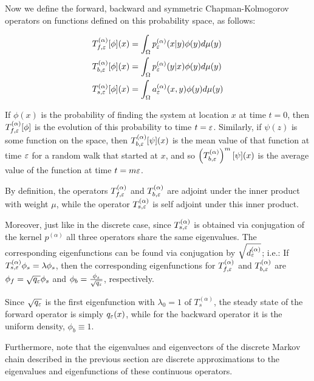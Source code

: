 Now we define the  forward, backward and symmetric Chapman-Kolmogorov operators on functions defined on this probability space, as follows:

\begin{definition}\begin{equation*}\begin{aligned}
T_{f,\varepsilon}^{(\alpha)}[\phi](x) &= \int_\Omega p_\varepsilon^{(\alpha)}(x|y)\phi(y)d\mu(y)\\
T_{b,\varepsilon}^{(\alpha)}[\phi](x) &= \int_\Omega p_\varepsilon^{(\alpha)}(y|x)\phi(y)d\mu(y)\\
T_{s,\varepsilon}^{(\alpha)}[\phi](x) &= \int_\Omega a_\varepsilon^{(\alpha)}(x,y)\phi(y)d\mu(y)
\end{aligned}\end{equation*}\end{definition}

If $\phi(x)$ is the probability of finding the system at location $x$ at time $t = 0$, then $T_{f,\varepsilon}^{(\alpha)}[\phi]$ is the evolution of this probability to time $t = \varepsilon$. Similarly, if $\psi(z)$ is some function on the space, then $T_{b,\varepsilon}^{(\alpha)}[\psi](x)$ is the mean value of that function at time $\varepsilon$ for a random walk that started at $x$, and so $\left(T_{b,\varepsilon}^{(\alpha)}\right)^m[\psi](x)$ is the average value of the function at time $t = m\varepsilon$.

By definition, the operators $T_{f,\varepsilon}^{(\alpha)}$ and $T_{b,\varepsilon}^{(\alpha)}$ are adjoint under the inner product with weight $\mu$, while the operator $T_{s,\varepsilon}^{(\alpha)}$ is self adjoint under this inner product.

Moreover, just like in the discrete case, since $T_{s,\varepsilon}^{(\alpha)}$ is obtained via conjugation of the kernel $p^{(\alpha)}$ all three operators share the same eigenvalues. The corresponding eigenfunctions can be found via
conjugation by $\sqrt{d^{(\alpha)}_\varepsilon}$; i.e.:
If $T_{s,\varepsilon}^{(\alpha)}\phi_s = \lambda\phi_s$, then the corresponding eigenfunctions for $T_{f,\varepsilon}^{(\alpha)}$ and $T_{b,\varepsilon}^{(\alpha)}$ are $\phi_f =
\sqrt{q_\varepsilon}\phi_s$ and $\phi_b = \frac{\phi_s}{\sqrt{q_\varepsilon}}$, respectively.

Since $\sqrt{q_\varepsilon}$ is the first eigenfunction with $\lambda_0 = 1$ of $T_s^{(\alpha)}$, the steady state of the forward operator is simply $q_\varepsilon(x)$, while for the backward operator it is the uniform density, $\phi_b \equiv 1$.

Furthermore, note that the eigenvalues and eigenvectors of the discrete Markov chain described in the previous section are discrete approximations to the eigenvalues and eigenfunctions of these continuous operators.

